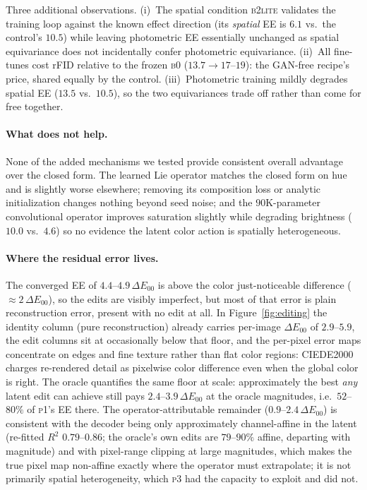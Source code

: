 \documentclass[11pt]{article}
\newcommand{\de}{\Delta E_{00}}
\begin{document}
Three additional observations. (i)~The spatial condition \textsc{b2lite}
validates the training loop against the known effect direction (its
\emph{spatial} EE is $6.1$ vs.\ the control's $10.5$) while leaving
photometric EE essentially unchanged as spatial equivariance does not
incidentally confer photometric equivariance. (ii)~All fine-tunes cost rFID relative to the
frozen \textsc{b0} ($13.7 \to 17$--$19$): the GAN-free recipe's price, shared
equally by the control. (iii)~Photometric training mildly degrades spatial EE
($13.5$ vs.\ $10.5$), so the two equivariances trade off rather than come for
free together.

\paragraph{What does not help.}
None of the added mechanisms we tested provide consistent overall advantage over the closed form. The
learned Lie operator matches the closed form on hue and is slightly worse
elsewhere; removing its composition loss or analytic initialization changes
nothing beyond seed noise; and the $90$K-parameter convolutional operator
improves saturation slightly while degrading brightness ($10.0$ vs.\ $4.6$) so no evidence the
latent color action is spatially heterogeneous.

\paragraph{Where the residual error lives.}
The converged EE of $4.4$--$4.9\,\de$ is above the color
just-noticeable difference ($\approx\!2\,\de$), so the edits are visibly
imperfect, but most of that error is plain reconstruction error, present
with no edit at all. In Figure~\ref{fig:editing} the identity column (pure
reconstruction) already carries per-image $\de$ of $2.9$--$5.9$, the edit
columns sit at occasionally below that floor, and the per-pixel error
maps concentrate on edges and fine texture rather than flat color regions:
CIEDE2000 charges re-rendered detail as pixelwise color difference even
when the global color is right. The oracle quantifies the same floor at
scale: approximately the best \emph{any} latent edit can achieve still pays
$2.4$--$3.9\,\de$ at the oracle magnitudes, i.e.\ $52$--$80\%$ of
\textsc{p1}'s EE there. The operator-attributable remainder
($0.9$--$2.4\,\de$) is consistent with the decoder being only approximately
channel-affine in the latent (re-fitted $R^2$ $0.79$--$0.86$; the oracle's
own edits are $79$--$90\%$ affine, departing with magnitude) and with
pixel-range clipping at large magnitudes, which makes the true pixel map
non-affine exactly where the operator must extrapolate; it is not primarily
spatial heterogeneity, which \textsc{p3} had the capacity to exploit and
did not.
\end{document}
